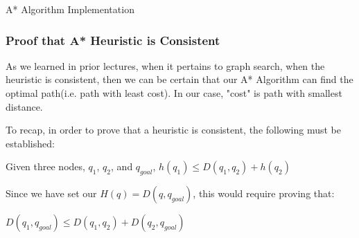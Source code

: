 \documentclass{article}
\begin{document}
\begin{algorithm}
\caption{A* Algorithm Implementation}
\begin{algorithmic}

    \ENDIF
    
    
    \ENDIF

    \ENDIF
    \ENDIF
    
    \ENDFOR
    \ENDWHILE
\end{algorithmic}
\end{algorithm}

\newpage 
\subsubsection{Proof that A* Heuristic is Consistent} 
As we learned in prior lectures, when it pertains to graph search, when the heuristic is consistent, then we can be certain that our A* Algorithm can find the optimal path(i.e. path with least cost). In our case, "cost" is path with smallest distance. \newline 

To recap, in order to prove that a heuristic is consistent, the following must be established: \newline 

Given three nodes, $q_1$, $q_2$, and $q_{goal}$, $h(q_1) \leq D(q_1, q_2) + h(q_2)$ \newline 

Since we have set our $H(q) = D(q, q_{goal})$, this would require proving that: \newline 

$D(q_1, q_{goal}) \leq D(q_1, q_2) + D(q_2, q_{goal})$ \newline 
\end{document}
